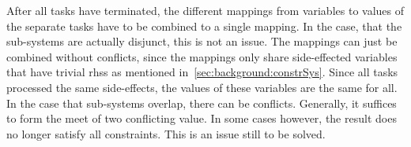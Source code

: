     After all tasks have terminated, the different mappings from variables to values of the separate tasks have to be combined to a single mapping. In the case, that the sub-systems are actually disjunct, this is not an issue. The mappings can just be combined without conflicts, since the mappings only share side-effected variables that have trivial \acp{rhs} as mentioned in~\autoref{sec:background:constrSys}. Since all tasks processed the same side-effects, the values of these variables are the same for all.
    In the case that sub-systems overlap, there can be conflicts. Generally, it suffices to form the meet of two conflicting value. In some cases however, the result does no longer satisfy all constraints. This is an issue still to be solved.
    
    